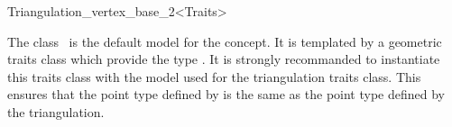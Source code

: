 

\begin{ccRefClass}{Triangulation_vertex_base_2<Traits>}  %


\ccDefinition
  
The class \ccRefName\ is the default model for the
 concept.
It is  templated by a geometric traits class which provide the type
. It is strongly recommanded to instantiate this
traits class with the model used for the triangulation traits class.
This ensures that the point type defined by \ccRefName
is the same as the point type defined by 
the triangulation.


\ccIsModel




\ccSeeAlso



\end{ccRefClass}


